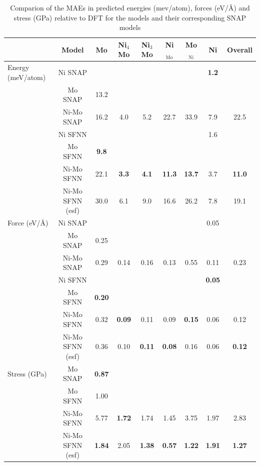 \documentclass[preprint]{revtex4-2}
\begin{document}
\begin{table}[h]
\centering
\begin{tabular}{lcccccccc}
\hline
    & Model & Mo & Ni$_4$Mo & Ni$_3$Mo & Ni$_{\mathrm{Mo}}$ & Mo$_{\mathrm{Ni}}$ 
    & Ni & Overall \\
\hline
Energy (meV/atom) & Ni SNAP & & & & & & \textbf{1.2} & \\
    & Mo SNAP & 13.2 & & & & & & \\
    & Ni-Mo SNAP & 16.2 & 4.0 & 5.2 & 22.7 & 33.9 & 7.9 & 22.5 \\
    & Ni SFNN & & & & & & 1.6 & \\
    & Mo SFNN & \textbf{9.8} & & & & & & \\
    & Ni-Mo SFNN & 22.1 & \textbf{3.3} & \textbf{4.1} & \textbf{11.3} 
    & \textbf{13.7} & 3.7 & \textbf{11.0} \\
    & Ni-Mo SFNN (esf) & 30.0 & 6.1 & 9.0 & 16.6 
    & 26.2 & 7.8 & 19.1 \\
\hline
Force (eV/\AA) & Ni SNAP & & & & & & 0.05 & \\
& Mo SNAP & 0.25 & & & & & & \\
& Ni-Mo SNAP & 0.29 & 0.14 & 0.16 & 0.13 & 0.55 & 0.11 & 0.23 \\
& Ni SFNN & & & & & & \textbf{0.05} & \\
& Mo SFNN & \textbf{0.20} & & & & & & \\
& Ni-Mo SFNN & 0.32 & \textbf{0.09} & 0.11 & 0.09 & 
    \textbf{0.15} & 0.06 & 0.12 \\
& Ni-Mo SFNN (esf) & 0.36 & 0.10 & \textbf{0.11} & \textbf{0.08} & 
    0.16 & 0.06 & \textbf{0.12} \\
\hline
Stress (GPa) & Mo SNAP & \textbf{0.87} & & & & & & \\
& Mo SFNN & 1.00 & & & & & & \\
& Ni-Mo SFNN & 5.77 & \textbf{1.72} & 1.74 & 1.45 & 3.75 & 1.97 & 2.83 \\
& Ni-Mo SFNN (esf) & \textbf{1.84} & 2.05 & \textbf{1.38} & \textbf{0.57} & 
    \textbf{1.22} & \textbf{1.91} & \textbf{1.27} \\
\hline
\end{tabular}
\caption{\label{table:MAE}
Comparion of the MAEs in predicted energies (mev/atom), forces (eV/\AA) and 
stress (GPa) relative to DFT for the \tensoralloy{} models and their 
corresponding SNAP models}
\end{table}
\end{document}
